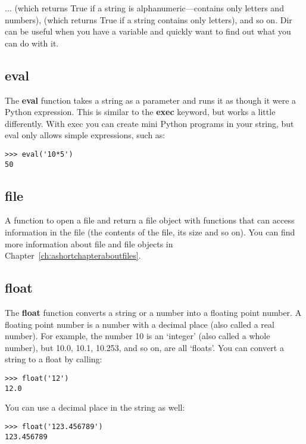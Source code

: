 $\ldots$ (which returns True if a string is alphanumeric---contains only letters and numbers),  (which returns True if a string contains only letters), and so on. Dir can be useful when you have a variable and quickly want to find out what you can do with it.

\subsection*{eval}

The \textbf{eval} function takes a string as a parameter and runs it as though it were a Python expression.  This is similar to the \textbf{exec} keyword, but works a little differently.  With exec you can create mini Python programs in your string, but eval only allows simple expressions, such as:

\begin{Verbatim}[frame=single]
>>> eval('10*5')
50
\end{Verbatim}

\subsection*{file}

A function to open a file and return a file object with functions that can access information in the file (the contents of the file, its size and so on). You can find more information about file and file objects in Chapter~\ref{ch:ashortchapteraboutfiles}.

\subsection*{float}

The \textbf{float} function converts a string or a number into a floating point number. A floating point number is a number with a decimal place (also called a real number). For example, the number 10 is an `integer' (also called a whole number), but 10.0, 10.1, 10.253, and so on, are all `floats'. You can convert a string to a float by calling:

\begin{Verbatim}[frame=single]
>>> float('12')
12.0
\end{Verbatim}

\noindent
You can use a decimal place in the string as well:

\begin{Verbatim}[frame=single]
>>> float('123.456789')
123.456789
\end{Verbatim}

